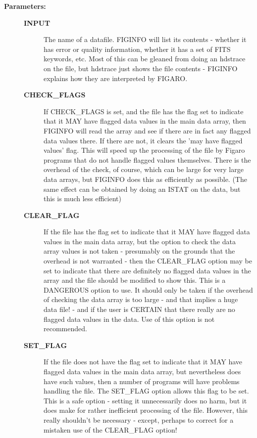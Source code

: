 \begin{description}
\item [{\bf Parameters:}]
\begin{description}
\item [{\bf INPUT}]
 The name of a datafile.
 FIGINFO will list its contents - whether it has error or
 quality information, whether it has a set of FITS keywords,
 etc. Most of this can be gleaned from doing an hdstrace on
 the file, but hdstrace just shows the file contents -
 FIGINFO explains how they are interpreted by FIGARO.
\item [{\bf CHECK_FLAGS}]
 If CHECK_FLAGS is set, and the file has the flag set to
 indicate that it MAY have flagged data values in the main
 data array, then FIGINFO will read the array and see if
 there are in fact any flagged data values there. If there
 are not, it clears the 'may have flagged values' flag.
 This will speed up the processing of the file by Figaro
 programs that do not handle flagged values themselves. There
 is the overhead of the check, of course, which can be large
 for very large data arrays, but FIGINFO does this as
 efficiently as possible. (The same effect can be obtained by
 doing an ISTAT on the data, but this is much less efficient)
\item [{\bf CLEAR_FLAG}]
 If the file has the flag set to indicate that it MAY have
 flagged data values in the main data array, but the option
 to check the data array values is not taken - presumably on
 the grounds that the overhead is not warranted - then the
 CLEAR_FLAG option may be set to indicate that there
 are definitely no flagged data values in the array and the
 file should be modified to show this. This is a DANGEROUS
 option to use. It should only be taken if the overhead of
 checking the data array is too large - and that implies a
 huge data file! - and if the user is CERTAIN that there
 really are no flagged data values in the data. Use of this
 option is not recommended.
\item [{\bf SET_FLAG}]
 If the file does not have the flag set to indicate that it
 MAY have flagged data values in the main data array, but
 nevertheless does have such values, then a number of programs
 will have problems handling the file. The SET_FLAG option
 allows this flag to be set. This is a safe option - setting
 it unnecessarily does no harm, but it does make for rather
 inefficient processing of the file. However, this really
 shouldn't be necessary - except, perhaps to correct for a
 mistaken use of the CLEAR_FLAG option!
\end{description}


\end{description}
